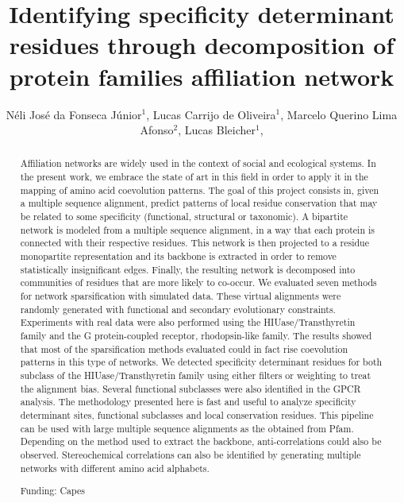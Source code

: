 \documentclass[twoside]{article}
\title{\vspace{-15mm}\fontsize{24pt}{10pt}\selectfont\textbf{ Identifying specificity determinant residues through decomposition of protein families affiliation network }} %
\author{ Néli José da Fonseca Júnior$^{1}$, Lucas Carrijo de Oliveira$^{1}$, Marcelo Querino Lima Afonso$^{2}$, Lucas Bleicher$^{1}$, }
\affil{ 1 Federal University of Minas Gerais

2 UFMG

 }
\date{}
\begin{document}
  
  
  \maketitle %
  
  
  \thispagestyle{fancy} %
  
  
  \begin{abstract}
  Affiliation networks are widely used in the context of social and ecological systems. In the present work, we embrace the state of art in this field in order to apply it in the mapping of amino acid coevolution patterns. The goal of this project consists in, given a multiple sequence alignment, predict patterns of local residue conservation that may be related to some specificity (functional, structural or taxonomic). A bipartite network is modeled from a multiple sequence alignment, in a way that each protein is connected with their respective residues. This network is then projected to a residue monopartite representation and its backbone is extracted in order to remove statistically insignificant edges. Finally, the resulting network is decomposed into communities of residues that are more likely to co-occur. We evaluated seven methods for network sparsification with simulated data. These virtual alignments were randomly generated with functional and secondary evolutionary constraints. Experiments with real data were also performed using the  HIUase/Transthyretin family and the G protein-coupled receptor, rhodopsin-like family. The results showed that most of the sparsification methods evaluated could in fact rise coevolution patterns in this type of networks. We detected specificity determinant residues for both subclass of the HIUase/Transthyretin family using either filters or weighting to treat the alignment bias. Several functional subclasses were also identified in the GPCR analysis. The methodology presented here is fast and useful to analyze specificity determinant sites, functional subclasses and local conservation residues. This pipeline can be used with large multiple sequence alignments as the obtained from Pfam. Depending on the method used to extract the backbone, anti-correlations could also be observed. Stereochemical correlations can also be identified by generating multiple networks with different amino acid alphabets.
  
  Funding: Capes \\ 
  \end{abstract}
  
\end{document}

